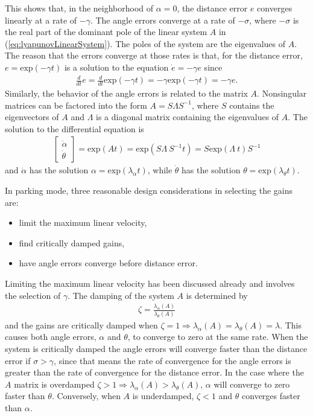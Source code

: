 This shows that, in the neighborhood of $\alpha=0$, the distance error $e$ converges linearly at a rate of $-\gamma$. The angle errors converge at a rate of $-\sigma$, where $-\sigma$ is the real part of the dominant pole of the linear system $A$ in (\ref{eq:lyapunovLinearSystem}). The poles of the system are the eigenvalues of $A$. The reason that the errors converge at those rates is that, for the distance error, $e=\text{exp}(-\gamma t)$ is a solution to the equation $\dot{e}=-\gamma e$ since 
\begin{align*}
\tfrac{d}{dt}e=\tfrac{d}{dt}\text{exp}(-\gamma t) = -\gamma \text{exp}(-\gamma t)=-\gamma e.
\end{align*}
Similarly, the behavior of the angle errors is related to the matrix $A$. Nonsingular matrices can be factored into the form $A=S\Lambda S^{-1}$, where $S$ contains the eigenvectors of $A$ and $\Lambda$ is a diagonal matrix containing the eigenvalues of $A$. The solution to the differential equation is
\begin{align*}
\left[\begin{array}{c} \dot{\alpha} \\ \dot{\theta} \end{array}\right] = \text{exp} (At)=\text{exp} (S\Lambda~S^{-1}t)=S\text{exp} (\Lambda~t) S^{-1}
\end{align*}
and $\dot{\alpha}$ has the solution $\alpha=\text{exp}(\lambda_\alpha t)$, while $\dot{\theta}$ has the solution $\theta=\text{exp}(\lambda_\theta t)$.

In parking mode, three reasonable design considerations in selecting the gains are:
\begin{itemize}
\item limit the maximum linear velocity,
\item find critically damped gains,
\item have angle errors converge before distance error.
\end{itemize}
Limiting the maximum linear velocity has been discussed already and involves the selection of $\gamma$. The damping of the system $A$ is determined by
\begin{align*}
\zeta = \frac{\lambda_\alpha(A)}{\lambda_\theta(A)}
\end{align*}
and the gains are critically damped when $\zeta = 1 \Rightarrow \lambda_\alpha(A)=\lambda_\theta(A)=\lambda$. This causes both angle errors, $\alpha$ and $\theta$, to converge to zero at the same rate. When the system is critically damped the angle errors will converge faster than the distance error if $\sigma>\gamma$, since that means the rate of convergence for the angle errors is greater than the rate of convergence for the distance error. In the case where the $A$ matrix is overdamped $\zeta > 1 \Rightarrow \lambda_\alpha(A) > \lambda_\theta(A)$, $\alpha$ will converge to zero faster than $\theta$. Conversely, when $A$ is underdamped, $\zeta < 1$ and $\theta$ converges faster than $\alpha$.


